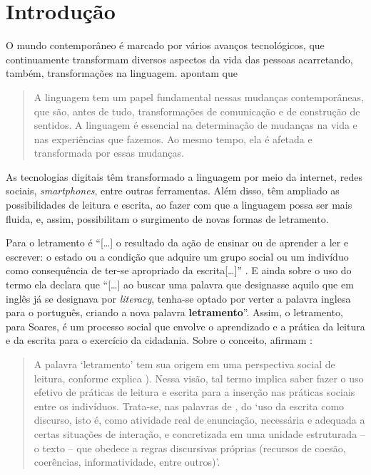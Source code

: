 \section{Introdução}\label{sec-intro}

O mundo contemporâneo é marcado por vários avanços tecnológicos, que
continuamente transformam diversos aspectos da vida das pessoas
acarretando, também, transformações na linguagem. \textcite[p.~13]{barton2015linguagem}
apontam que

\begin{quote}
A linguagem tem um papel fundamental nessas mudanças contemporâneas, que
são, antes de tudo, transformações de comunicação e de construção de
sentidos. A linguagem é essencial na determinação de mudanças na vida e
nas experiências que fazemos. Ao mesmo tempo, ela é afetada e
transformada por essas mudanças.
\end{quote}

As tecnologias digitais têm transformado a linguagem por meio da
internet, redes sociais, \emph{smartphones}, entre outras ferramentas.
Além disso, têm ampliado as possibilidades de leitura e escrita, ao
fazer com que a linguagem possa ser mais fluida, e, assim, possibilitam
o surgimento de novas formas de letramento.

Para \textcite{soares2006letramento} o letramento é ``{[}\ldots{]} o resultado da ação de
ensinar ou de aprender a ler e escrever: o estado ou a condição que
adquire um grupo social ou um indivíduo como consequência de ter-se
apropriado da escrita{[}\ldots{]}'' \cite[p. 18]{soares2006letramento}. E ainda sobre o
uso do termo ela declara que ``{[}\ldots{]} ao buscar uma palavra que
designasse aquilo que em inglês já se designava por \emph{literacy},
tenha-se optado por verter a palavra inglesa para o português, criando a
nova palavra \textbf{letramento}''\cite[p.~18, grifo do autor]{soares2006letramento}. Assim, o letramento, para Soares, é um processo
social que envolve o aprendizado e a prática da leitura e da escrita
para o exercício da cidadania. Sobre o conceito, afirmam \textcite[p.~33]{alves2023alfabetizacao}:

\begin{quote}
    A palavra ‘letramento’ tem sua origem em uma perspectiva social de leitura, conforme explica \textcite{soares2020A-alfabetizacao,soares2020C-alfabetar}). Nessa visão, tal termo implica saber fazer o uso efetivo de práticas de leitura e escrita para a inserção nas práticas sociais entre os indivíduos. Trata-se, nas palavras de \textcite[p.~79]{soares2020A-alfabetizacao}, do ‘uso da escrita como discurso, isto é, como atividade real de enunciação, necessária e adequada a certas situações de interação, e concretizada em uma unidade estruturada – o texto – que obedece a regras discursivas próprias (recursos de coesão, coerências, informatividade, entre outros)’.
\end{quote}


